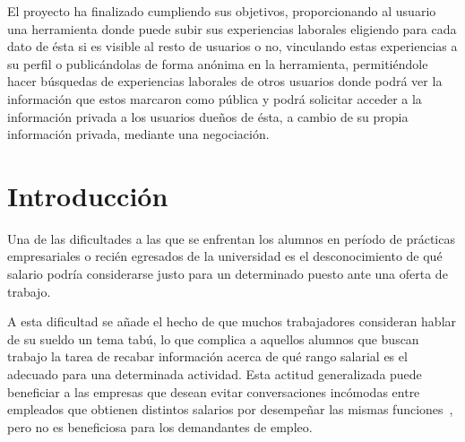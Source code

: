 \documentclass[a4paper, 12pt]{book}
\begin{document}
    El proyecto ha finalizado cumpliendo sus objetivos, proporcionando al usuario una herramienta donde puede subir sus experiencias laborales
    eligiendo para cada dato de ésta si es visible al resto de usuarios o no, vinculando estas experiencias a su perfil o publicándolas
    de forma anónima en la herramienta, permitiéndole hacer búsquedas de experiencias laborales de otros usuarios donde podrá ver la información
    que estos marcaron como pública y podrá solicitar acceder a la información privada a los usuarios dueños de ésta, a cambio de su propia
    información privada, mediante una negociación.


    \tableofcontents
    \cleardoublepage
    \listoffigures %



    \cleardoublepage


    \chapter{Introducción}
    \label{sec:intro} %

    Una de las dificultades a las que se enfrentan los alumnos en período de prácticas empresariales o recién egresados de la universidad
    es el desconocimiento de qué salario podría considerarse justo para un determinado puesto ante una oferta de trabajo.

    A esta dificultad se añade el hecho de que muchos trabajadores consideran hablar de su sueldo un tema tabú,
    lo que complica a aquellos alumnos que buscan trabajo la tarea de recabar información acerca de qué rango salarial es el adecuado para una determinada actividad.
    Esta actitud generalizada puede beneficiar a las empresas que desean evitar conversaciones incómodas entre empleados
    que obtienen distintos salarios por desempeñar las mismas funciones~\cite{bib:wsj,bib:theatlantic}, pero no es beneficiosa para los
    demandantes de empleo.
\end{document}
